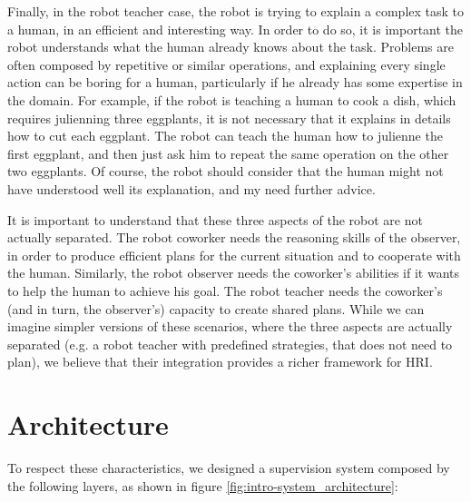 Finally, in the robot teacher case, the robot is trying to explain a complex task to a human, in an efficient and interesting way. In order to do so, it is important the robot understands what the human already knows about the task. Problems are often composed by repetitive or similar operations, and explaining every single action can be boring for a human, particularly if he already has some expertise in the domain. For example, if the robot is teaching a human to cook a dish, which requires julienning three eggplants, it is not necessary that it explains in details how to cut each eggplant. The robot can teach the human how to julienne the first eggplant, and then just ask him to repeat the same operation on the other two eggplants. Of course, the robot should consider that the human might not have understood well its explanation, and my need further advice.  

It is important to understand that these three aspects of the robot are not actually separated. The robot coworker needs the reasoning skills of the observer, in order to produce efficient plans for the current situation and to cooperate with the human. Similarly, the robot observer needs the coworker's abilities if it wants to help the human to achieve his goal. The robot teacher needs the coworker's (and in turn, the observer's) capacity to create shared plans. While we can imagine simpler versions of these scenarios, where the three aspects are actually separated (e.g. a robot teacher with predefined strategies, that does not need to plan), we believe that their integration provides a richer framework for HRI.


\section{Architecture}
\label{sec:overview-architecture}
To respect these characteristics, we designed a supervision system composed by the following layers, as shown in figure \ref{fig:intro-system_architecture}:


